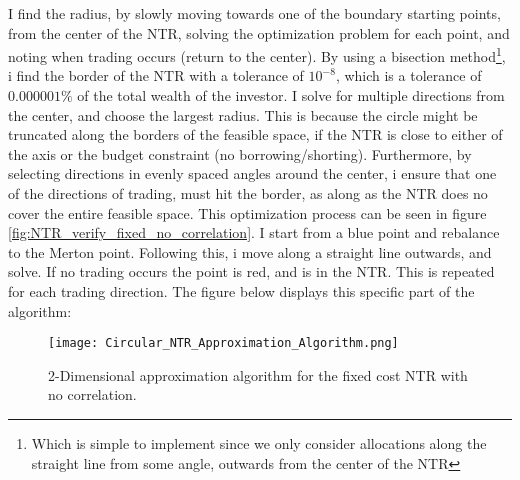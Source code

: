 \documentclass[11pt]{article}
\begin{document}
I find the radius, by slowly moving towards one of the boundary starting points, from the center of the NTR, solving the optimization problem for each point,
and noting when trading occurs (return to the center). By using a bisection method\footnote{Which is simple to implement since we only consider allocations along the straight line from some angle, outwards from the center of the NTR},
i find the border of the \ac{NTR} with a tolerance of $10^{-8}$,
which is a tolerance of $0.000001\%$ of the total wealth of the investor. I solve for multiple directions from the center, and choose the largest radius. This is because the circle might be truncated along the borders of the feasible space,
if the NTR is close to either of the axis or the budget constraint (no borrowing/shorting).
Furthermore, by selecting directions in evenly spaced angles around the center, i ensure that one of the directions of trading, must hit the border, as along as the \ac{NTR} does no cover the entire feasible space.
This optimization process can be seen in figure \ref{fig:NTR_verify_fixed_no_correlation}. I start from a blue point and rebalance to the Merton point.
Following this, i move along a straight line outwards, and solve. If no trading occurs the point is red, and is in the \ac{NTR}. 
This is repeated for each trading direction. The figure below displays this specific part of the algorithm:
\begin{figure}[!ht]
    \centering
    \texttt{[image: Circular\_NTR\_Approximation\_Algorithm.png]}
    \caption{2-Dimensional approximation algorithm for the fixed cost NTR with no correlation.}
    \label{fig:FixedCost_NTR_Approximation}
\end{figure}
\end{document}
